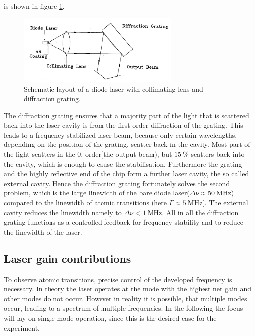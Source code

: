 is shown in figure \ref{fig:aufbau}.
\begin{figure}
  \centering
  \includegraphics[width=0.7\textwidth]{aufbau.png}
  \caption{Schematic layout of a diode laser with collimating lens and diffraction grating.\cite{V60}}
  \label{fig:aufbau}
\end{figure}

The diffraction grating ensures that a majority part of
the light that is scattered back into the laser cavity is from the first order
diffraction of the grating. This leads to
a frequency-stabilized laser beam, because only certain wavelengths,
depending on the position
of the grating, scatter back in the cavity.
Most part of the light scatters in the 0. order(the output beam), but $\SI{15}{\percent}$ scatters back into
the cavity, which is enough to cause the stabilisation.
Furthermore the grating and the highly reflective end of the chip form a
further laser cavity,
the so called external cavity.
Hence the diffraction grating fortunately solves the second
problem, which is the large linewidth of the bare
diode laser($\Delta \nu \approx \SI{50}{\mega\hertz}$)
compared to the linewidth of atomic transitions
(here $\Gamma \approx \SI{5}{\mega\hertz}$).
The external cavity
reduces the linewidth namely to $\Delta \nu < \SI{1}{\mega\hertz}$.
All in all the diffraction grating
functions as a controlled feedback for frequency stability
and to reduce the linewidth of the laser.


\newpage
\subsection{Laser gain contributions}
\label{subsec:}
To observe atomic transitions, precise control
of the developed frequency is necessary.
  In theory the laser operates at the mode with the highest net gain
and other modes do not occur.
However in reality it is possible, that multiple modes occur, leading
to a spectrum of multiple frequencies. In the following the focus will
lay on single mode operation, since this is the desired case
for the experiment.

